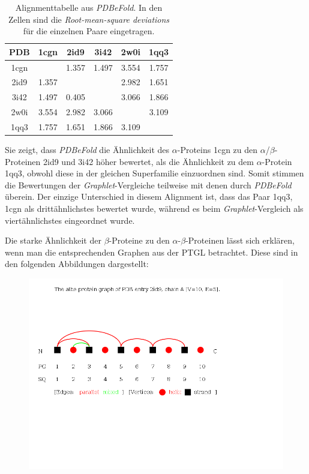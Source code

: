 \documentclass{report}
\begin{document}
\begin{table}
\begin{tabular}{ | c | c | c | c | c | c | }
\hline
PDB & 1cgn    & 2id9  & 3i42  & 2w0i  & 1qq3 \\ \hline
1cgn &        & 1.357 & 1.497 & 3.554 & 1.757 \\ \hline
2id9 & 1.357  &       &       & 2.982 & 1.651 \\ \hline
3i42 &  1.497 & 0.405 &       & 3.066 & 1.866 \\ \hline
2w0i & 3.554  & 2.982 & 3.066 &       & 3.109  \\ \hline
1qq3 & 1.757  & 1.651 & 1.866 & 3.109 &       \\ \hline
\end{tabular}
\label{tab:efold_comp1}
\caption{Alignmenttabelle aus  \textit{PDBeFold}. In den Zellen sind die \textit{Root-mean-square deviations} f\"ur die einzelnen Paare eingetragen.}
\end{table}


Sie zeigt, dass \textit{PDBeFold} die \"Ahnlichkeit des $\alpha$-Proteins 1cgn zu den $\alpha$/$\beta$-Proteinen 2id9 und 3i42 h\"oher bewertet, als die \"Ahnlichkeit zu dem $\alpha$-Protein 1qq3, obwohl diese in der gleichen Superfamilie einzuordnen sind. Somit stimmen die Bewertungen der \textit{Graphlet}-Vergleiche teilweise mit denen durch \textit{PDBeFold} \"uberein. Der einzige Unterschied in diesem Alignment ist, dass das Paar 1qq3, 1cgn als dritt\"ahnlichstes bewertet wurde, w\"ahrend es beim \textit{Graphlet}-Vergleich als viert\"ahnlichstes eingeordnet wurde.


Die starke \"Ahnlichkeit der $\beta$-Proteine zu den $\alpha$-$\beta$-Proteinen l\"asst sich erkl\"aren, wenn man die entsprechenden Graphen aus der PTGL betrachtet. Diese sind in den folgenden Abbildungen dargestellt:

\begin{figure}
\includegraphics[scale=0.5]{2id9_A_albe_PG.png}
\end{figure}
\end{document}
